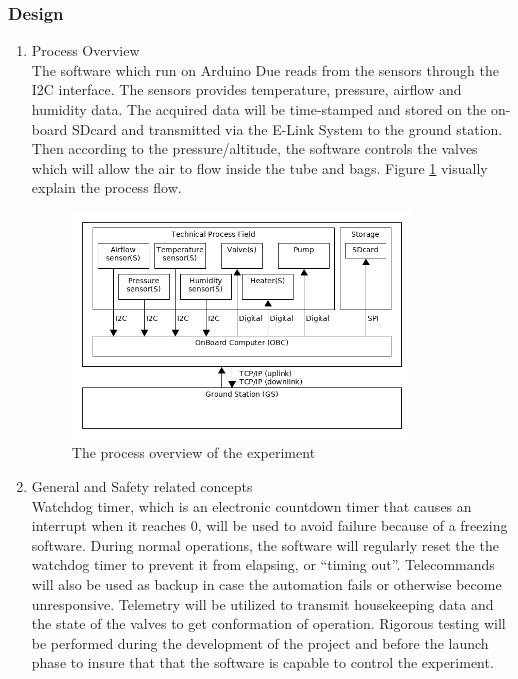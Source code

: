 \subsubsection{Design}
\begin{enumerate}[label=(\alph*)]
\item{Process Overview}\\
The software which run on Arduino Due reads from the sensors through the I2C interface. The sensors provides temperature, pressure, airflow and humidity data. The acquired data will be time-stamped and stored on the on-board SDcard and transmitted via the E-Link System to the ground station. Then according to the pressure/altitude, the software controls the valves which will allow the air to flow inside the tube and bags. Figure \ref{processOverview} visually explain the process flow.
\begin{figure}[H]
    \centering
    \includegraphics[width=0.85\textwidth]{4-experiment-design/img/Process-overview-V0-1.png}
    \caption{The process overview of the experiment}
    \label{processOverview}
\end{figure}
\item{General and Safety related concepts}\\
Watchdog timer, which is an electronic countdown timer that causes an interrupt when it reaches 0, will be used to avoid failure because of a freezing software. During normal operations, the software will regularly reset the the watchdog timer to prevent it from elapsing, or \enquote{timing out}. Telecommands will also be used as backup in case the automation fails or otherwise become unresponsive. Telemetry will be utilized to transmit housekeeping data and the state of the valves to get conformation of operation. Rigorous testing will be performed during the development of the project and before the launch phase to insure that that the software is capable to control the experiment.\\

\end{enumerate}
